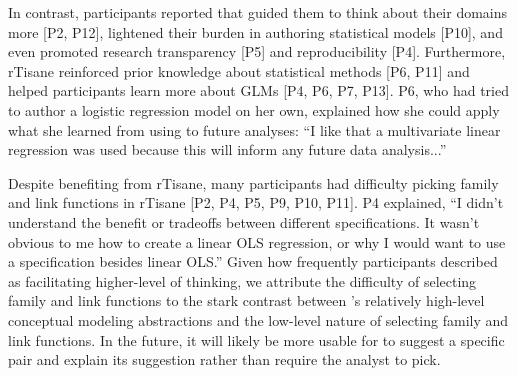 In contrast, participants reported that \rTisane guided them to think about
their domains more [P2, P12], lightened their burden in authoring statistical
models [P10], and even promoted research transparency [P5] and reproducibility
[P4]. Furthermore, rTisane reinforced prior knowledge about statistical methods
[P6, P11] and helped participants learn more about GLMs [P4, P6, P7, P13]. P6,
who had tried to author a logistic regression model on her own, explained how
she could apply what she learned from using \rTisane to future analyses: ``I
like that a multivariate linear regression was used because this will inform
any future data analysis...''

\begin{comment}
Nevertheless, participants expected \rTisane to do more automatically.
Participants were expected rTisane’s output statistical model to include more
IVs [P2, P5], have interaction terms [P5, P6], and have coefficient values that
were similar to ones from their own statistical models without rTisane [P10].
Yet, when asked if anything surprised them about rTisane’s output statistical
model, six participants said the models were as they expected [P4, 6, 10, 11,
12, 13]. 
\end{comment}


Despite benefiting from rTisane, many participants had difficulty picking family
and link functions in rTisane [P2, P4, P5, P9, P10, P11]. P4 explained, ``I
didn't understand the benefit or tradeoffs between different specifications. It
wasn't obvious to me how to create a linear OLS regression, or why I would want
to use a specification besides linear OLS.'' Given how frequently participants
described \rTisane as facilitating higher-level of thinking, we attribute the
difficulty of selecting family and link functions to the stark contrast between
\rTisane’s relatively high-level conceptual modeling abstractions and the
low-level nature of selecting family and link functions. In the future, it will
likely be more usable for \rTisane to suggest a specific pair and explain its
suggestion rather than require the analyst to pick.

